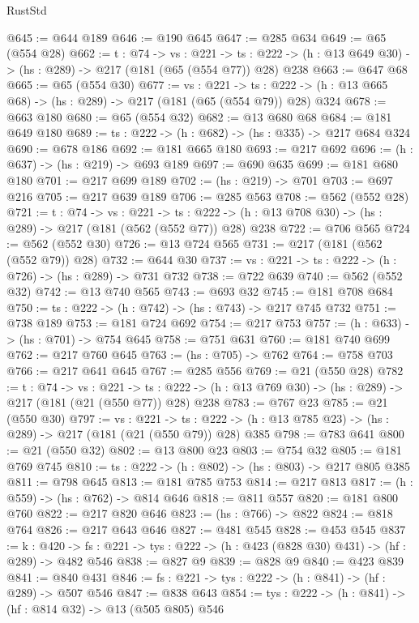 \begin{lexlean}{RustStd}
\begin{coremodule}
{\begin{coremodule}
{{{@645 := @644 @189
@646 := @190 @645
@647 := @285 @634
@649 := @65 (@554 @28)
@662 := {t : @74} ->
  {vs : @221} ->
  {ts : @222} -> (h : @13 @649 @30) -> (hs : @289) -> @217 (@181 (@65 (@554 @77)) @28) @238
@663 := @647 @68
@665 := @65 (@554 @30)
@677 := {vs : @221} ->
  {ts : @222} -> (h : @13 @665 @68) -> (hs : @289) -> @217 (@181 (@65 (@554 @79)) @28) @324
@678 := @663 @180
@680 := @65 (@554 @32)
@682 := @13 @680 @68
@684 := @181 @649 @180
@689 := {ts : @222} -> (h : @682) -> (hs : @335) -> @217 @684 @324
@690 := @678 @186
@692 := @181 @665 @180
@693 := @217 @692
@696 := (h : @637) -> (hs : @219) -> @693 @189
@697 := @690 @635
@699 := @181 @680 @180
@701 := @217 @699 @189
@702 := (hs : @219) -> @701
@703 := @697 @216
@705 := @217 @639 @189
@706 := @285 @563
@708 := @562 (@552 @28)
@721 := {t : @74} ->
  {vs : @221} ->
  {ts : @222} -> (h : @13 @708 @30) -> (hs : @289) -> @217 (@181 (@562 (@552 @77)) @28) @238
@722 := @706 @565
@724 := @562 (@552 @30)
@726 := @13 @724 @565
@731 := @217 (@181 (@562 (@552 @79)) @28)
@732 := @644 @30
@737 := {vs : @221} -> {ts : @222} -> (h : @726) -> (hs : @289) -> @731 @732
@738 := @722 @639
@740 := @562 (@552 @32)
@742 := @13 @740 @565
@743 := @693 @32
@745 := @181 @708 @684
@750 := {ts : @222} -> (h : @742) -> (hs : @743) -> @217 @745 @732
@751 := @738 @189
@753 := @181 @724 @692
@754 := @217 @753
@757 := (h : @633) -> (hs : @701) -> @754 @645
@758 := @751 @631
@760 := @181 @740 @699
@762 := @217 @760 @645
@763 := (hs : @705) -> @762
@764 := @758 @703
@766 := @217 @641 @645
@767 := @285 @556
@769 := @21 (@550 @28)
@782 := {t : @74} ->
  {vs : @221} ->
  {ts : @222} -> (h : @13 @769 @30) -> (hs : @289) -> @217 (@181 (@21 (@550 @77)) @28) @238
@783 := @767 @23
@785 := @21 (@550 @30)
@797 := {vs : @221} ->
  {ts : @222} -> (h : @13 @785 @23) -> (hs : @289) -> @217 (@181 (@21 (@550 @79)) @28) @385
@798 := @783 @641
@800 := @21 (@550 @32)
@802 := @13 @800 @23
@803 := @754 @32
@805 := @181 @769 @745
@810 := {ts : @222} -> (h : @802) -> (hs : @803) -> @217 @805 @385
@811 := @798 @645
@813 := @181 @785 @753
@814 := @217 @813
@817 := (h : @559) -> (hs : @762) -> @814 @646
@818 := @811 @557
@820 := @181 @800 @760
@822 := @217 @820 @646
@823 := (hs : @766) -> @822
@824 := @818 @764
@826 := @217 @643 @646
@827 := @481 @545
@828 := @453 @545
@837 := {k : @420} ->
  {fs : @221} -> {tys : @222} -> (h : @423 (@828 @30) @431) -> (hf : @289) -> @482 @546
@838 := @827 @9
@839 := @828 @9
@840 := @423 @839
@841 := @840 @431
@846 := {fs : @221} -> {tys : @222} -> (h : @841) -> (hf : @289) -> @507 @546
@847 := @838 @643
@854 := {tys : @222} -> (h : @841) -> (hf : @814 @32) -> @13 (@505 @805) @546
}}}
\end{coremodule}}
\end{coremodule}
\end{lexlean}
